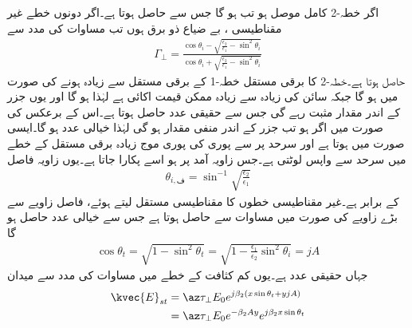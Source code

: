 اگر خطہ-2 کامل موصل ہو تب  ہو گا جس سے  حاصل ہوتا ہے۔اگر دونوں خطے غیر مقناطیسی ، بے ضیاع ذو برق ہوں تب مساوات  کی مدد سے
\begin{align}\label{مساوات_ترچھی_شرح_انعکاس_عمودی_موج}
\Gamma_{\perp}=\frac{\cos \theta_i -\sqrt{\frac{\epsilon_2}{\epsilon_1}-\sin^2 \theta_i}}{\cos \theta_i +\sqrt{\frac{\epsilon_2}{\epsilon_1}-\sin^2 \theta_i}}
\end{align}
حاصل ہوتا ہے۔خطہ-2 کا برقی مستقل خطہ-1 کے برقی مستقل سے زیادہ ہونے کی صورت  میں  ہو گا جبکہ سائن کی زیادہ سے زیادہ ممکن قیمت اکائی ہے  لہٰذا  ہو گا اور یوں جزر کے اندر مقدار مثبت رہے گی جس سے  حقیقی عدد حاصل ہوتا ہے۔اس کے برعکس  کی صورت میں اگر  ہو تب جزر کے اندر منفی مقدار ہو گی لہٰذا  خیالی عدد ہو گا۔ایسی صورت میں  ہوتا ہے اور سرحد پر   سے  پوری کی پوری موج زیادہ برقی مستقل کے خطے میں سرحد سے واپس لوٹتی ہے۔جس زاویہ آمد پر  ہو اسے  پکارا جاتا ہے۔یوں زاویہ فاصل
\begin{align}\label{مساوات_ترچھی_فاصل_زاویہ}
\theta_{i,\text{ف}}= \sin^{-1} \sqrt{\frac{\epsilon_2}{\epsilon_1}}
\end{align}
کے برابر ہے۔غیر مقناطیسی خطوں کا مقناطیسی مستقل  لیتے ہوئے، فاصل زاویے سے بڑے زاویے  کی صورت میں مساوات  سے  حاصل ہوتا ہے جس سے  خیالی عدد حاصل ہو گا
\begin{align}\label{مساوات_ترچھی_خیالی_انحرافی_زاویہ}
\cos \theta_t=\sqrt{1-\sin^2 \theta_t}=\sqrt{1-\frac{\epsilon_1}{\epsilon_2}\sin^2 \theta_i} =jA
\end{align}
جہاں  حقیقی عدد ہے۔یوں کم کثافت کے خطے میں مساوات  کی مدد سے میدان
\begin{align*}
\kvec{E}_{st} &=\az \tau_{\perp} E_0 e^{j \beta_2 (x \sin \theta_t+y jA)} \\
&=\az \tau_{\perp} E_0 e^{-\beta_2 A y}e^{j \beta_2 x \sin \theta_t}
\end{align*}
